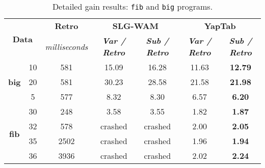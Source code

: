 \begin{table}[ht]
\centering
\footnotesize{
  \begin{tabular}{cc|c|cc|cc}
   \hline
    \hline
    \multicolumn{2}{c|}{\multirow{2}{*}{\small{\textbf{Data}}}} & \textbf{\small{Retro}} & \multicolumn{2}{c|}{\small{\textbf{SLG-WAM}}} & \multicolumn{2}{c}{\small{\textbf{YapTab}}} \\
     \multicolumn{2}{c|}{} & \scriptsize{\textit{milliseconds}} & \textbf{\textit{\scriptsize{Var / Retro}}} & \textbf{\textit{\scriptsize{Sub / Retro}}} & \textbf{\textit{\scriptsize{Var / Retro}}} & \textbf{\textit{\scriptsize{Sub / Retro}}} \\
   \hline
   \hline

   \multirow{3}{*}{\textbf{big}} &  10 &  581 &  15.09  &  16.28  &  11.63 & \textbf{12.79} \\
   &  20 &  581 &  30.23  &  28.58  &  21.58 & \textbf{21.98} \\
   &  5 &  577 &  8.32  &  8.30  &  6.57 & \textbf{6.20} \\
   \hline
   \multirow{4}{*}{\textbf{fib}} &  30 &  248 &  3.58  &  3.55  &  1.82 & \textbf{1.87} \\
   &  32 &  578 &  \scriptsize{crashed}  &  \scriptsize{crashed}  &  2.00 & \textbf{2.05} \\
   &  35 &  2502 &  \scriptsize{crashed}  &  \scriptsize{crashed}  &  1.96 & \textbf{1.94} \\
   &  36 &  3936 &  \scriptsize{crashed}  &  \scriptsize{crashed}  &  2.02 & \textbf{2.24} \\
   \hline
\hline
\end{tabular}
}
\caption{Detailed gain results: \texttt{fib} and \texttt{big} programs.}
\label{tbl:results_detail_gain_fib}
\end{table}